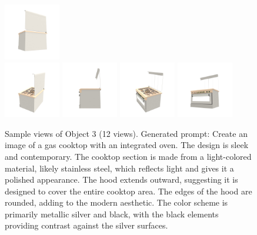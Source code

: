 \begin{figure}[htbp]
  \includegraphics[width=0.22\textwidth]{images/data/samples/obj3/007.jpeg}\\
  \includegraphics[width=0.22\textwidth]{images/data/samples/obj3/008.jpeg}\hfill
  \includegraphics[width=0.22\textwidth]{images/data/samples/obj3/009.jpeg}\hfill
  \includegraphics[width=0.22\textwidth]{images/data/samples/obj3/010.jpeg}\hfill
  \includegraphics[width=0.22\textwidth]{images/data/samples/obj3/011.jpeg}
  \caption{Sample views of Object 3 (12 views). Generated prompt: Create an image of a gas cooktop with an integrated oven. The design is sleek and contemporary. The cooktop section is made from a light-colored material, likely stainless steel, which reflects light and gives it a polished appearance. The hood extends outward, suggesting it is designed to cover the entire cooktop area. The edges of the hood are rounded, adding to the modern aesthetic. The color scheme is primarily metallic silver and black, with the black elements providing contrast against the silver surfaces.}
  \label{fig:dataset-sample-obj3}
\end{figure}


